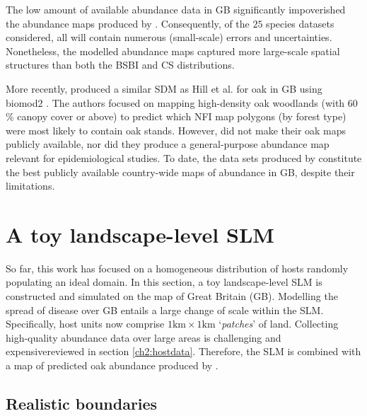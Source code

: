 The low amount of available abundance data in GB significantly impoverished the abundance maps produced by \cite{hill.data}. 
Consequently, of the $25$ species datasets considered, all will contain numerous (small-scale) errors and uncertainties. 
Nonetheless, the modelled abundance maps captured more large-scale spatial structures than both the BSBI and CS distributions.

More recently, \cite{ray2021multi} produced a similar SDM as Hill et al. for oak in GB using biomod2 \cite{thuiller2016package}.
The authors focused on mapping high-density oak woodlands (with 60$\%$ canopy cover or above) 
to predict which NFI map polygons (by forest type) were most likely to contain oak stands. 
However, \cite{ray2021multi} did not make their oak maps publicly available, nor did they produce a general-purpose
abundance map relevant for epidemiological studies. 
To date, the data sets produced by \cite{hill.data} constitute the best publicly available
country-wide maps of abundance in GB, despite their limitations.

\newpage

\section{A toy landscape-level SLM}

So far, this work has focused on a homogeneous distribution of hosts randomly populating an ideal domain. 
In this section, a toy landscape-level SLM is constructed and simulated on the map of Great Britain (GB).
Modelling the spread of disease over GB entails a large change of scale within the SLM. 
Specifically, host units now comprise $\mathrm{1km \times 1km}$ `\textit{patches}' of land. 
Collecting high-quality abundance data over large areas is challenging and expensive\textemdash reviewed in section \ref{ch2:hostdata}.
Therefore, the SLM is combined with a map of predicted oak abundance produced by \cite{hill.data}.

\subsection{Realistic boundaries}

